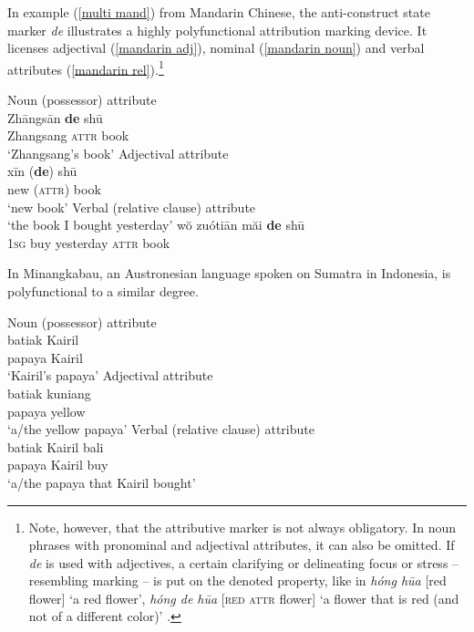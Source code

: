 In example (\ref{multi mand}) from Mandarin Chinese, the anti\hyp{}construct state marker \textit{de} illustrates a highly polyfunctional attribution marking device. It licenses adjectival (\ref{mandarin adj}), nominal (\ref{mandarin noun}) and verbal attributes (\ref{mandarin rel}).\footnote{Note, however, that the attributive marker is not always obligatory. In noun phrases with pronominal and adjectival attributes, it can also be omitted. If \textit{de} is used with adjectives, a certain clarifying or delineating focus or stress – resembling  marking – is put on the denoted property, like in \textit{hóng hūa} [red flower] ‘a red flower’, \textit{hóng de hūa} [\textsc{red} \textsc{attr} flower] ‘a flower that is red (and not of a different color)’ \citep[119–123]{li-etal1981}.}
\begin{exe}
\ex
\label{multi mand}
\begin{xlist}
\ex	\rm{Noun (possessor) attribute}\\
\label{mandarin noun}
\gll	Zhāngsān 	\textbf{de} 	shū\\
	Zhangsang 	\textsc{attr} 	book\\
\glt	‘Zhangsang's book’
\ex	\rm{Adjectival attribute}\\
\label{mandarin adj}
\gll	xīn 		(\textbf{de}) 	shū\\
	new	 	(\textsc{attr}) 	book\\
\glt	‘new book’
\ex	\rm{Verbal (relative clause) attribute}\\
\label{mandarin rel}
\glt	‘the book I bought yesterday’
\gll	wŏ 			zuótiān 	măi 		\textbf{de} 	shū\\
	\textsc{1sg} 	buy		yesterday 	\textsc{attr} 	book\\
\end{xlist}
\end{exe}
In Minangkabau, an Austronesian language spoken on Sumatra in Indonesia,  is polyfunctional to a similar degree.
\begin{exe}
\ex
\label{multi minangkabau}
\begin{xlist}
\ex \rm{Noun (possessor) attribute}\\
\gll	batiak Kairil\\
	papaya Kairil\\
\glt	‘Kairil's papaya’
\ex \rm{Adjectival attribute}\\
\gll	batiak kuniang\\
	papaya yellow\\
\glt	‘a/the yellow papaya’
\ex \rm{Verbal (relative clause) attribute}\\
\gll	batiak Kairil bali\\
	papaya Kairil buy\\
\glt	‘a/the papaya that Kairil bought’
\end{xlist}
\end{exe}
